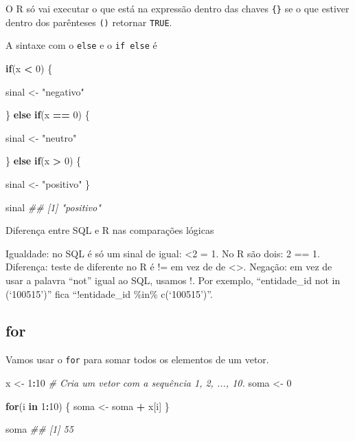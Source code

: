 \documentclass[
]{book}
\newenvironment{Shaded}{\begin{snugshade}}{\end{snugshade}}
\newcommand{\CommentTok}[1]{\textcolor[rgb]{0.56,0.35,0.01}{\textit{#1}}}
\newcommand{\ControlFlowTok}[1]{\textcolor[rgb]{0.13,0.29,0.53}{\textbf{#1}}}
\newcommand{\DecValTok}[1]{\textcolor[rgb]{0.00,0.00,0.81}{#1}}
\newcommand{\NormalTok}[1]{#1}
\newcommand{\OperatorTok}[1]{\textcolor[rgb]{0.81,0.36,0.00}{\textbf{#1}}}
\newcommand{\StringTok}[1]{\textcolor[rgb]{0.31,0.60,0.02}{#1}}
\begin{document}
O R só vai executar o que está na expressão dentro das chaves \texttt{\{\}} se o que estiver dentro dos parênteses \texttt{()} retornar \texttt{TRUE}.

A sintaxe com o \texttt{else} e o \texttt{if\ else} é

\begin{Shaded}
\begin{Highlighting}[]
\ControlFlowTok{if}\NormalTok{(x }\OperatorTok{<}\StringTok{ }\DecValTok{0}\NormalTok{) \{}
  
\NormalTok{  sinal <-}\StringTok{ "negativo"}
  
\NormalTok{\} }\ControlFlowTok{else} \ControlFlowTok{if}\NormalTok{(x }\OperatorTok{==}\StringTok{ }\DecValTok{0}\NormalTok{) \{}
  
\NormalTok{  sinal <-}\StringTok{ "neutro"}
  
\NormalTok{\} }\ControlFlowTok{else} \ControlFlowTok{if}\NormalTok{(x }\OperatorTok{>}\StringTok{ }\DecValTok{0}\NormalTok{) \{}
  
\NormalTok{  sinal <-}\StringTok{ "positivo"}
\NormalTok{\}}

\NormalTok{sinal}
\CommentTok{## [1] "positivo"}
\end{Highlighting}
\end{Shaded}

Diferença entre SQL e R nas comparações lógicas

Igualdade: no SQL é só um sinal de igual: \textless2 = 1. No R são dois: 2 == 1.
Diferença: teste de diferente no R é != em vez de de \textless\textgreater.
Negação: em vez de usar a palavra ``not'' igual ao SQL, usamos !. Por exemplo, ``entidade\_id not in (`100515')'' fica ``!entidade\_id \%in\% c(`100515')''.

\hypertarget{for}{%
\subsection{for}\label{for}}

Vamos usar o \texttt{for} para somar todos os elementos de um vetor.

\begin{Shaded}
\begin{Highlighting}[]
\NormalTok{x <-}\StringTok{ }\DecValTok{1}\OperatorTok{:}\DecValTok{10}   \CommentTok{# Cria um vetor com a sequência 1, 2, ..., 10.}
\NormalTok{soma <-}\StringTok{ }\DecValTok{0}

\ControlFlowTok{for}\NormalTok{(i }\ControlFlowTok{in} \DecValTok{1}\OperatorTok{:}\DecValTok{10}\NormalTok{) \{}
\NormalTok{  soma <-}\StringTok{ }\NormalTok{soma }\OperatorTok{+}\StringTok{ }\NormalTok{x[i]}
\NormalTok{\}}

\NormalTok{soma}
\CommentTok{## [1] 55}
\end{Highlighting}
\end{Shaded}
\end{document}
